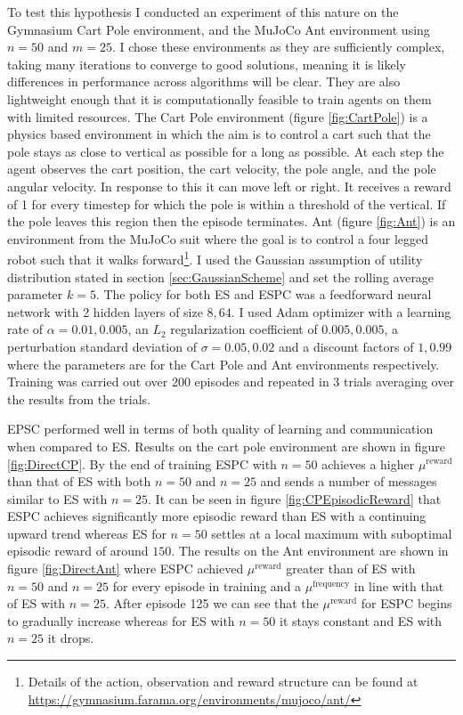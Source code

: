 To test this hypothesis I conducted an experiment of this nature on the Gymnasium Cart Pole environment, and the MuJoCo Ant environment 
using $n=50$ and $m=25$. I chose these environments as they are sufficiently complex, taking many iterations to converge to good solutions, meaning it is likely differences in performance across algorithms will be clear. They are also lightweight enough that it is computationally feasible to train agents on them with limited resources.
The Cart Pole environment (figure \ref{fig:CartPole}) is a physics based environment in which the aim is to control a cart such that the pole stays as close to vertical as possible for a long as possible. 
At each step the agent observes the cart position, the cart velocity, the pole angle, and the pole angular velocity. In response to this it can move left or right. 
It receives a reward of 1 for every timestep for which the pole is within a threshold of the vertical. If the pole leaves this region then the episode terminates. Ant (figure \ref{fig:Ant}) is an environment from the MuJoCo suit where the goal is to control a four legged robot such that it walks forward\footnote{Details of the action, observation and reward structure can be found at \url{https://gymnasium.farama.org/environments/mujoco/ant/}}. I used the Gaussian assumption of utility distribution stated in section \ref{sec:GaussianScheme} and set the rolling average parameter $k=5$. The policy for both ES and ESPC was a feedforward neural network with 2 hidden layers of size $8,64$. I used Adam optimizer \cite{Adam} with a learning rate of $\alpha=0.01,0.005$, an $L_2$ regularization coefficient of $0.005,0.005$, a perturbation standard deviation of $\sigma=0.05,0.02$ and a discount factors of $1,0.99$ where the parameters are for the Cart Pole and Ant environments respectively. Training was carried out over 200 episodes and repeated in 3 trials averaging over the results from the trials.
\label{sec:ESPCEval}

EPSC performed well in terms of both quality of learning and communication when compared to ES. 
Results on the cart pole environment are shown in figure \ref{fig:DirectCP}. By the end of training ESPC with $n=50$ achieves a higher $\mu^\text{reward}$ than that of ES with both $n=50$ and $n=25$ and sends a number of messages similar to ES with $n=25$. It can be seen in figure \ref{fig:CPEpisodicReward} that ESPC achieves significantly more episodic reward than ES with a continuing upward trend whereas ES for $n=50$ settles at a local maximum with suboptimal episodic reward of around $150$. 
The results on the Ant environment are shown in figure \ref{fig:DirectAnt} where ESPC achieved $\mu^\text{reward}$ greater than of ES with $n=50$ and $n=25$ for every episode in training and a $\mu^\text{frequency}$ in line with that of ES with $n=25$. After episode 125 we can see that the $\mu^\text{reward}$ for ESPC begins to gradually increase whereas for ES with $n=50$ it stays constant and ES with $n=25$ it drops.

